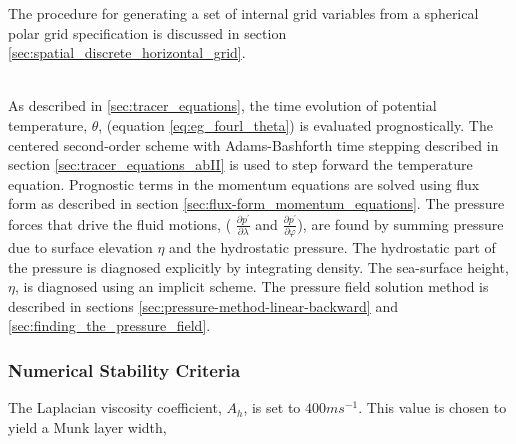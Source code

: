 The procedure for generating a set of internal grid variables from a
spherical polar grid specification is discussed in section 
\ref{sec:spatial_discrete_horizontal_grid}.

\noindent{}\\



As described in \ref{sec:tracer_equations}, the time evolution of potential 
temperature, 
$\theta$, (equation \ref{eq:eg_fourl_theta})
is evaluated prognostically. The centered second-order scheme with
Adams-Bashforth time stepping described in section 
\ref{sec:tracer_equations_abII} is used to step forward the temperature 
equation. Prognostic terms in
the momentum equations are solved using flux form as
described in section \ref{sec:flux-form_momentum_equations}.
The pressure forces that drive the fluid motions, (
$\frac{\partial p^{'}}{\partial \lambda}$ and $\frac{\partial p^{'}}{\partial \varphi}$), are found by summing pressure due to surface 
elevation $\eta$ and the hydrostatic pressure. The hydrostatic part of the 
pressure is diagnosed explicitly by integrating density. The sea-surface
height, $\eta$, is diagnosed using an implicit scheme. The pressure
field solution method is described in sections
\ref{sec:pressure-method-linear-backward} and 
\ref{sec:finding_the_pressure_field}.

\subsubsection{Numerical Stability Criteria}

The Laplacian viscosity coefficient, $A_{h}$, is set to $400 m s^{-1}$.
This value is chosen to yield a Munk layer width,

